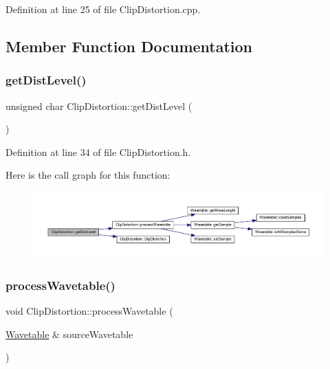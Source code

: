 Definition at line 25 of file Clip\+Distortion.\+cpp.



\subsection{Member Function Documentation}
\mbox{\label{class_clip_distortion_a2a2656f1baaaa42f9c240040ecee9c68}} 
\subsubsection{\texorpdfstring{get\+Dist\+Level()}{getDistLevel()}}
{\footnotesize\ttfamily unsigned char Clip\+Distortion\+::get\+Dist\+Level (\begin{DoxyParamCaption}{ }\end{DoxyParamCaption})\hspace{0.3cm}{\ttfamily [inline]}}



Definition at line 34 of file Clip\+Distortion.\+h.

Here is the call graph for this function\+:
\nopagebreak
\begin{figure}[H]
\begin{center}
\leavevmode
\includegraphics[width=350pt]{d8/da2/class_clip_distortion_a2a2656f1baaaa42f9c240040ecee9c68_cgraph}
\end{center}
\end{figure}
\mbox{\label{class_clip_distortion_a761af22fbd15eb8bcc9ac0fdfe4d655d}} 
\subsubsection{\texorpdfstring{process\+Wavetable()}{processWavetable()}}
{\footnotesize\ttfamily void Clip\+Distortion\+::process\+Wavetable (\begin{DoxyParamCaption}\item[{\hyperlink{class_wavetable}{Wavetable} \&}]{source\+Wavetable }\end{DoxyParamCaption})}



